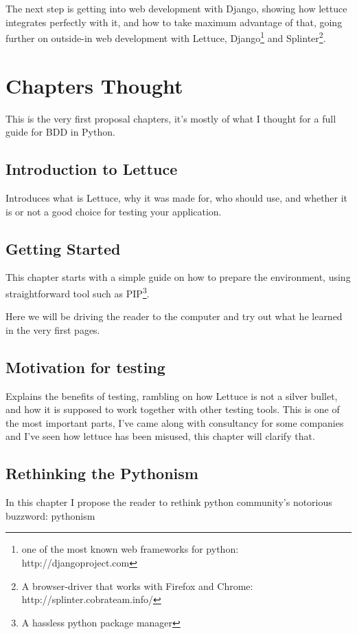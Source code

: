 \documentclass[letterpaper]{article}
\begin{document}
\noindent
The next step is getting into web development with Django, showing how
lettuce integrates perfectly with it, and how to take maximum
advantage of that, going further on outside-in web development with
Lettuce, Django\footnote{one of the most known web frameworks for python: http://djangoproject.com} and Splinter\footnote{A browser-driver that works with Firefox and Chrome: http://splinter.cobrateam.info/}.

\section*{Chapters Thought}
This is the very first proposal chapters, it's mostly of what I
thought for a full guide for BDD in Python.

\subsection*{Introduction to Lettuce}
\noindent
Introduces what is Lettuce, why it was made for, who should use, and
whether it is or not a good choice for testing your application.

\subsection*{Getting Started}
\noindent
This chapter starts with a simple guide on how to prepare the environment, using straightforward tool such as PIP\footnote{A hassless python package manager}.

Here we will be driving the reader to the computer and try out what he
learned in the very first pages.

\subsection*{Motivation for testing}
\noindent
Explains the benefits of testing, rambling on how Lettuce is not a
silver bullet, and how it is supposed to work together with other
testing tools.
\noindent
This is one of the most important parts, I've came along with
consultancy for some companies and I've seen how lettuce has been
misused, this chapter will clarify that.

\subsection*{Rethinking the Pythonism}
\noindent
In this chapter I propose the reader to rethink python community's
notorious buzzword: pythonism
\end{document}

